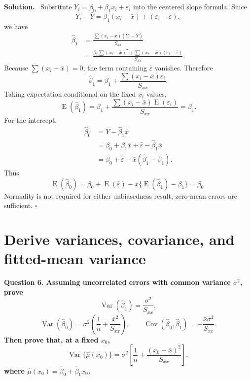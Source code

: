 \documentclass[11pt]{article}
\newcommand{\Sxx}{S_{xx}}
\newcommand{\bzero}{\widehat{\beta}_0}
\newcommand{\bone}{\widehat{\beta}_1}
\newcommand{\Var}{\operatorname{Var}}
\newcommand{\Cov}{\operatorname{Cov}}
\newcommand{\E}{\operatorname{E}}
\newenvironment{question}
  {\par\medskip\noindent\color{navy}\bfseries}
  {\par\medskip\color{black}}
\newenvironment{solution}
  {\noindent\color{darkgreen}\textbf{Solution.}\color{black}\ }
  {\hfill$\square$\par\medskip}
\begin{document}
\begin{solution}
Substitute $Y_i=\beta_0+\beta_1x_i+\varepsilon_i$ into the centered slope
formula. Since
\[
 Y_i-\bar Y=\beta_1(x_i-\bar x)+(\varepsilon_i-\bar\varepsilon),
\]
we have
\begin{align*}
\bone
 &=\frac{\sum(x_i-\bar x)(Y_i-\bar Y)}{\Sxx}\\
 &=\frac{\beta_1\sum(x_i-\bar x)^2
   +\sum(x_i-\bar x)(\varepsilon_i-\bar\varepsilon)}{\Sxx}.
\end{align*}
Because $\sum(x_i-\bar x)=0$, the term containing $\bar\varepsilon$
vanishes. Therefore
\[
  \bone=\beta_1+
  \frac{\sum(x_i-\bar x)\varepsilon_i}{\Sxx}.
\]
Taking expectation conditional on the fixed $x_i$ values,
\[
 \E(\bone)
 =\beta_1+\frac{\sum(x_i-\bar x)\E(\varepsilon_i)}{\Sxx}
 =\beta_1.
\]
For the intercept,
\begin{align*}
\bzero
 &=\bar Y-\bone\bar x\\
 &=\beta_0+\beta_1\bar x+\bar\varepsilon-\bone\bar x\\
 &=\beta_0+\bar\varepsilon-\bar x(\bone-\beta_1).
\end{align*}
Thus
\[
 \E(\bzero)
 =\beta_0+\E(\bar\varepsilon)
  -\bar x\{\E(\bone)-\beta_1\}
 =\beta_0.
\]
Normality is not required for either unbiasedness result; zero-mean errors
are sufficient.
\end{solution}

\section{Derive variances, covariance, and fitted-mean variance}

\begin{question}
Question 6. Assuming uncorrelated errors with common variance $\sigma^2$,
prove
\[
 \boxed{\Var(\bone)=\frac{\sigma^2}{\Sxx}},
\]
\[
 \boxed{\Var(\bzero)=\sigma^2\left(\frac1n+
              \frac{\bar x^2}{\Sxx}\right)},
 \qquad
 \boxed{\Cov(\bzero,\bone)=-\frac{\bar x\sigma^2}{\Sxx}}.
\]
Then prove that, at a fixed $x_0$,
\[
 \boxed{\Var\{\widehat{\mu}(x_0)\}
 =\sigma^2\left[\frac1n+\frac{(x_0-\bar x)^2}{\Sxx}\right]},
\]
where $\widehat{\mu}(x_0)=\bzero+\bone x_0$.
\end{question}
\end{document}
